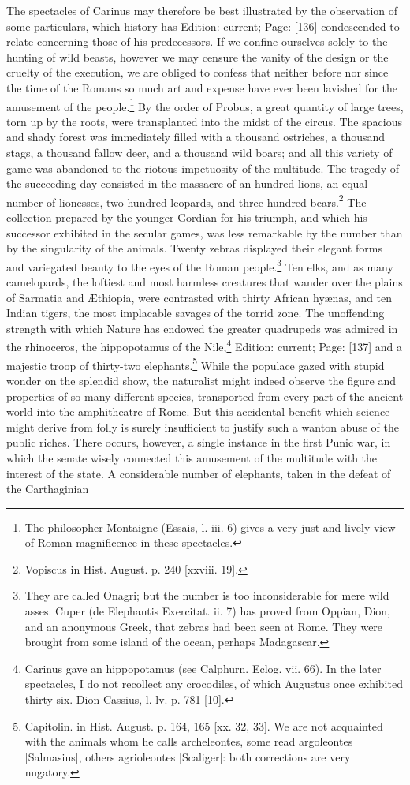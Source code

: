 The spectacles of Carinus may therefore be best illustrated by the observation of some particulars, which history has Edition: current; Page: [136] condescended to relate concerning those of his predecessors. If we confine ourselves solely to the hunting of wild beasts, however we may censure the vanity of the design or the cruelty of the execution, we are obliged to confess that neither before nor since the time of the Romans so much art and expense have ever been lavished for the amusement of the people.\footnote{The philosopher Montaigne (Essais, l. iii. 6) gives a very just and lively view of Roman magnificence in these spectacles.} By the order of Probus, a great quantity of large trees, torn up by the roots, were transplanted into the midst of the circus. The spacious and shady forest was immediately filled with a thousand ostriches, a thousand stags, a thousand fallow deer, and a thousand wild boars; and all this variety of game was abandoned to the riotous impetuosity of the multitude. The tragedy of the succeeding day consisted in the massacre of an hundred lions, an equal number of lionesses, two hundred leopards, and three hundred bears.\footnote{Vopiscus in Hist. August. p. 240 [xxviii. 19].} The collection prepared by the younger Gordian for his triumph, and which his successor exhibited in the secular games, was less remarkable by the number than by the singularity of the animals. Twenty zebras displayed their elegant forms and variegated beauty to the eyes of the Roman people.\footnote{They are called Onagri; but the number is too inconsiderable for mere wild asses. Cuper (de Elephantis Exercitat. ii. 7) has proved from Oppian, Dion, and an anonymous Greek, that zebras had been seen at Rome. They were brought from some island of the ocean, perhaps Madagascar.} Ten elks, and as many camelopards, the loftiest and most harmless creatures that wander over the plains of Sarmatia and Æthiopia, were contrasted with thirty African hyænas, and ten Indian tigers, the most implacable savages of the torrid zone. The unoffending strength with which Nature has endowed the greater quadrupeds was admired in the rhinoceros, the hippopotamus of the Nile,\footnote{Carinus gave an hippopotamus (see Calphurn. Eclog. vii. 66). In the later spectacles, I do not recollect any crocodiles, of which Augustus once exhibited thirty-six. Dion Cassius, l. lv. p. 781 [10].} Edition: current; Page: [137] and a majestic troop of thirty-two elephants.\footnote{Capitolin. in Hist. August. p. 164, 165 [xx. 32, 33]. We are not acquainted with the animals whom he calls archeleontes, some read argoleontes [Salmasius], others agrioleontes [Scaliger]: both corrections are very nugatory.} While the populace gazed with stupid wonder on the splendid show, the naturalist might indeed observe the figure and properties of so many different species, transported from every part of the ancient world into the amphitheatre of Rome. But this accidental benefit which science might derive from folly is surely insufficient to justify such a wanton abuse of the public riches. There occurs, however, a single instance in the first Punic war, in which the senate wisely connected this amusement of the multitude with the interest of the state. A considerable number of elephants, taken in the defeat of the Carthaginian 